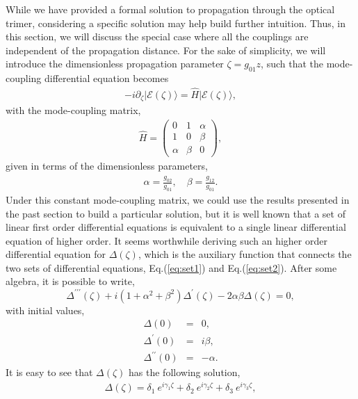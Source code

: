 \documentclass[9pt,twocolumn,twoside]{osajnl}
\begin{document}
While we have provided a formal solution to propagation through the optical trimer, considering a specific solution may help build further intuition. 
Thus, in this section, we will discuss the special case where all the couplings are independent of the propagation distance.
For the sake of simplicity, we will introduce the dimensionless propagation parameter $\zeta = g_{01} z$, such that the mode-coupling differential equation becomes 
\begin{eqnarray}
- i \partial_{\zeta} \vert \mathcal{E}(\zeta) \rangle = \hat{H} \vert \mathcal{E}(\zeta) \rangle, 
\end{eqnarray}
with the mode-coupling matrix,
\begin{eqnarray}
\hat{H} = \left( \begin{array}{ccc} 
0  & 1 & \alpha  \\
1 & 0 & \beta \\
\alpha & \beta & 0
\end{array} \right), \label{eq:hmlt2}
\end{eqnarray}
given in terms of the dimensionless parameters,
\begin{eqnarray}
\alpha =\frac{g_{02}}{g_{01}}, \quad \beta=\frac{g_{12}}{g_{01}}.
\end{eqnarray}
Under this constant mode-coupling matrix, we could use the results presented in the past section to build a particular solution, but it is well known that a set of linear first order differential equations is equivalent to a single linear differential equation of higher order.
It seems worthwhile deriving such an higher order differential equation for $\Delta(\zeta)$, which is the auxiliary function that connects the two sets of differential equations, Eq.(\ref{eq:set1}) and Eq.(\ref{eq:set2}).
After some algebra, it is possible to write,
\begin{equation}
\Delta^{\prime\prime\prime}(\zeta) + i(1+\alpha^2+\beta^2)\Delta ^{\prime}(\zeta) -2 \alpha\beta\Delta(\zeta) = 0,\label{eq:ddiff}
\end{equation}
with initial values,
\begin{eqnarray}
\Delta(0) & = & 0, \\
\Delta^{\prime}(0) &=& i\beta, \\
\Delta^{\prime\prime}(0) &=& -\alpha.
\end{eqnarray}
It is easy to see that $\Delta(\zeta)$ has the following solution,
\begin{eqnarray}
\Delta(\zeta) = \delta_{1} \: e^{i \gamma_1 \zeta} + \delta_{2} \: e^{i \gamma_2 \zeta} +  \delta_{3} \: e^{i \gamma_3 \zeta},
\end{eqnarray}  
\end{document}
